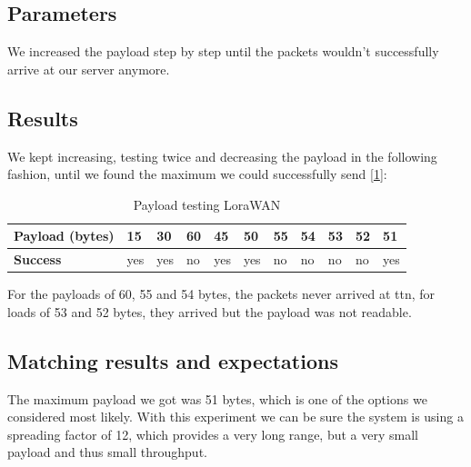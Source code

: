 	\subsection{Parameters}
		We increased the payload step by step until the packets wouldn't successfully arrive at our server anymore.
	\subsection{Results}
		We kept increasing, testing twice and decreasing the payload in the following fashion, until we found the maximum we could successfully send [\ref{tab:LoraWanPayload}]:

		\begin{table}[h]
			\begin{tabular}{@{}l|llllllllll@{}}
				\textbf{Payload (bytes)} & 15  & 30  & 60 & 45  & 50  & 55 & 54 & 53 & 52 & 51  \\\hline
				\textbf{Success} & yes & yes & no & yes & yes & no & no & no & no & yes
			\end{tabular}
			\caption[Payload testing LoraWAN]{Payload testing LoraWAN}
			\label{tab:LoraWanPayload}
		\end{table}

		For the payloads of 60, 55 and 54 bytes, the packets never arrived at ttn, for loads of 53 and 52 bytes, they arrived but the payload was not readable.

	\subsection{Matching results and expectations}
		The maximum payload we got was 51 bytes, which is one of the options we considered most likely. With this experiment we can be sure the system is using a spreading factor of 12, which provides a very long range, but a very small payload and thus small throughput.

